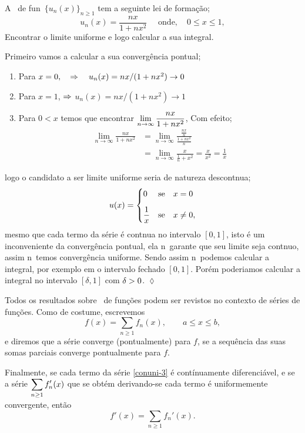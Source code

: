\begin{exer}
A \seq\ de fun\coes\  $\{u_n(x)\}_{n\geq 1}$ tem a seguinte lei de
forma\c c\~ao;
$$u_n(x)= \frac{nx}{1+nx^2} \quad \text{ onde},\quad 0\leq x \leq 1,$$
Encontrar  o limite uniforme e logo calcular a sua integral.
\end{exer}

\solo Primeiro vamos a calcular a sua convergência pontual;
\begin{enumerate}[label=(\alph*),leftmargin=2.0cm]
  \item Para $x=0,\quad \Rightarrow\quad u_n(x)=nx/(1+nx^2)\to 0$
  \item Para $x=1$, \quad $\Rightarrow$ \quad $u_n(x)=nx/(1+nx^2)\to 1$
\item Para $0<x$ temos que encontrar
$\displaystyle{\lim_{n\to\infty}\frac{nx}{1+nx^2}}$, Com efeito;
\begin{equation*}
  \begin{split}
\lim_{n\to\infty}\frac{nx}{1+nx^2}&=\lim_{n\to\infty}\frac{\frac{nx}{n}}{\frac{1+nx^2}{n}}\\[2ex]
&=\lim_{n\to\infty}\frac{x}{\frac{1}{n}+x^2}=\frac{x}{x^2}=\frac{1}{x}
  \end{split}
\end{equation*}
\end{enumerate}
logo  o candidato a ser limite uniforme seria de natureza
descont\ii nua;
\[u(x)=
  \begin{cases}
    0 & \text{se} \quad x=0 \\[2ex]
    \displaystyle{\frac{1}{x}} & \text{se} \quad x\not=0,
  \end{cases}
 \]
 mesmo que cada termo da s\'erie \'e cont\ii nua no intervalo
 $[0,1]$, isto \'e um inconveniente da convergência pontual, ela
 n\ao\ garante que seu limite seja cont\ii nuo, assim
 n\ao\ temos convergência uniforme. Sendo assim n\ao\ podemos
calcular a integral, por exemplo em o intervalo fechado $[0,1]$.
Por\'em poderiamos calcular a integral no intervalo $[\delta, 1]$
com $\delta>0$. \hfill \(\lozenge\)

Todos os resultados sobre \seq\ de funções podem ser revistos no
contexto de séries de funções. Como de costume, escrevemos
\begin{equation}\label{conuni-3}
f(x) =\sum_{n\geq 1} f_n(x),\qquad  a \leq x \leq b,
\end{equation}
e diremos que a série converge (pontualmente) para $f$, se a
sequência das suas somas parciais converge pontualmente para $f$.

Finalmente, se cada termo da série \eqref{conuni-3} é
contínuamente diferenciável, e se a série $\displaystyle{\sum_{n\geq 1
}f_n'(x)}$ que se obtém derivando-se cada termo é uniformemente
convergente, então
\begin{equation*}
  f'(x) =\sum_{n\geq 1} f_n'(x).
\end{equation*}

